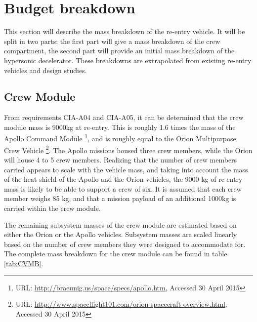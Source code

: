 \section{Budget breakdown} \label{ch:budget}
This section will describe the mass breakdown of the re-entry vehicle. It will be split in two parts; the first part will give a mass breakdown of the crew compartment, the second part will provide an initial mass breakdown of the hypersonic decelerator. These breakdowns are extrapolated from existing re-entry vehicles and design studies.

\subsection{Crew Module}
From requirements CIA-A04 and CIA-A05, it can be determined that the crew module mass is 9000kg at re-entry. This is roughly 1.6 times the mass of the Apollo Command Module \footnote{URL: \url{http://braeunig.us/space/specs/apollo.htm}, Accessed 30 April 2015}, and is roughly equal to the Orion Multipurpose Crew Vehicle \footnote{URL: \url{http://www.spaceflight101.com/orion-spacecraft-overview.html}, Accessed 30 April 2015}. The Apollo missions housed three crew members, while the Orion will house 4 to 5 crew members. Realizing that the number of crew members carried appears to scale with the vehicle mass, and taking into account the mass of the heat shield of the Apollo and the Orion vehicles, the 9000 kg of re-entry mass is likely to be able to support a crew of six. It is assumed that each crew member weighs 85 kg, and that a mission payload of an additional 1000kg is carried within the crew module. 

The remaining subsystem masses of the crew module are estimated based on either the Orion or the Apollo vehicles. Subsystem masses are scaled linearly based on the number of crew members they were designed to accommodate for. The complete mass breakdown for the crew module can be found in table \ref{tab:CVMB}.


